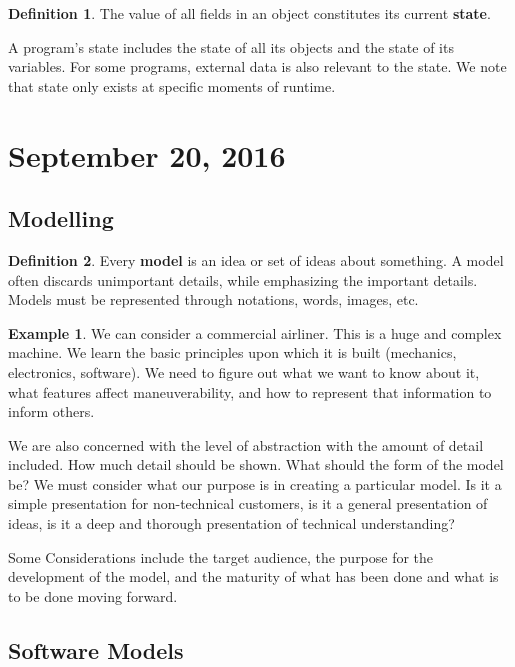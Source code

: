 \documentclass[11pt]{article}
\theoremstyle{plain} %
\theoremstyle{definition}
\newtheorem*{definition}{Definition} %
\theoremstyle{example}
\newtheorem*{example}{Example}
\theoremstyle{remark}
\begin{document}
\begin{definition}
The value of all fields in an object constitutes its current \textbf{state}. 
\end{definition}

A program's state includes the state of all its objects and the state of its variables. For some programs, external data is also relevant to the state. We note that state only exists at specific moments of runtime. 








\section{September 20, 2016}
\subsection{Modelling}

\begin{definition} Every \textbf{model} is an idea or set of ideas about something. A model often discards unimportant details, while emphasizing the important details. Models must be represented through notations, words, images, etc.
\end{definition}

\begin{example}
We can consider a commercial airliner. This is a huge and complex machine. We learn the basic principles upon which it is built (mechanics, electronics, software). We need to figure out what we want to know about it, what features affect maneuverability, and how to represent that information to inform others. 
\end{example}

We are also concerned with the level of abstraction with the amount of detail included. How much detail should be shown. What should the form of the model be? We must consider what our purpose is in creating a particular model. Is it a simple presentation for non-technical customers, is it a general presentation of ideas, is it a deep and thorough presentation of technical understanding?


Some Considerations include the target audience, the purpose for the development of the model, and the maturity of what has been done and what is to be done moving forward. 



\subsection{Software Models}
\end{document}
